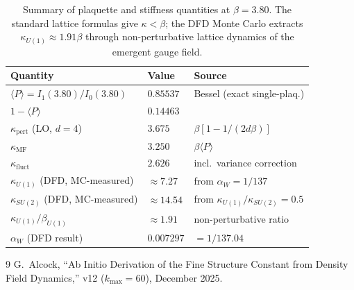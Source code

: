 \documentclass[12pt,a4paper]{article}
\newcommand{\bU}{\beta_{U(1)}}
\newcommand{\kU}{\kappa_{U(1)}}
\newcommand{\kS}{\kappa_{SU(2)}}
\newcommand{\aW}{\alpha_W}
\begin{document}
\begin{table}[h]
\centering
\begin{tabular}{@{}lll@{}}
\toprule
Quantity & Value & Source \\
\midrule
$\langle P\rangle = I_1(3.80)/I_0(3.80)$ & $0.85537$ & Bessel (exact single-plaq.) \\
$1 - \langle P\rangle$ & $0.14463$ & \\
$\kappa_{\text{pert}}$ (LO, $d=4$) & $3.675$ & $\beta[1-1/(2d\beta)]$ \\
$\kappa_{\text{MF}}$ & $3.250$ & $\beta\langle P\rangle$ \\
$\kappa_{\text{fluct}}$ & $2.626$ & incl.\ variance correction \\
\midrule
$\kU$ (DFD, MC-measured) & $\approx 7.27$ & from $\aW = 1/137$ \\
$\kS$ (DFD, MC-measured) & $\approx 14.54$ & from $\kU/\kS = 0.5$ \\
$\kU/\bU$ & $\approx 1.91$ & non-perturbative ratio \\
$\aW$ (DFD result) & $0.007297$ & $= 1/137.04$ \\
\bottomrule
\end{tabular}
\caption{Summary of plaquette and stiffness quantities at $\beta = 3.80$.
The standard lattice formulas give $\kappa < \beta$; the DFD Monte Carlo
extracts $\kU \approx 1.91\beta$ through non-perturbative lattice dynamics
of the emergent gauge field.}
\end{table}


\begin{thebibliography}{9}
G.~Alcock, ``Ab Initio Derivation of the Fine Structure Constant from
Density Field Dynamics,'' v12 ($k_{\max}=60$), December 2025.
\end{thebibliography}
\end{document}
